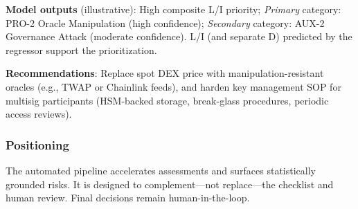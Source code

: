 \textbf{Model outputs} (illustrative): High composite L/I priority; \textit{Primary} category: PRO-2 Oracle Manipulation (high confidence); \textit{Secondary} category: AUX-2 Governance Attack (moderate confidence). L/I (and separate D) predicted by the regressor support the prioritization.

\textbf{Recommendations}: Replace spot DEX price with manipulation-resistant oracles (e.g., TWAP or Chainlink feeds), and harden key management SOP for multisig participants (HSM-backed storage, break-glass procedures, periodic access reviews).

\subsubsection{Positioning}
The automated pipeline accelerates assessments and surfaces statistically grounded risks. It is designed to complement---not replace---the checklist and human review. Final decisions remain human-in-the-loop.


